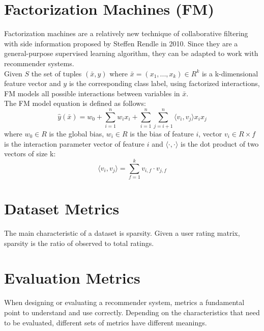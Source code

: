 \section{Factorization Machines (FM)}
\label{factorization-machines}

Factorization machines \cite{10.1109/ICDM.2010.127} are a relatively new technique of collaborative filtering with side information proposed by Steffen Rendle in 2010. Since they are a general-purpose supervised learning algorithm, they can be adapted to work with recommender systems.\\
Given $S$ the set of tuples $(\bar{x}, y)$ where $\bar{x} = (x_1, ..., x_k) \in R^k$ is a k-dimensional feature vector and $y$ is the corresponding class label, using factorized interactions, FM models all possible interactions between variables in $\bar{x}$.\\
The FM model equation is defined as follows:
\begin{equation*}
\hat{y}(\bar{x}) = w_0 + \sum_{i = 1}^{n} w_i x_i + \sum_{i = 1}^{n} \sum_{j = i + 1}^{n} \langle v_i, v_j \rangle x_i x_j
\end{equation*}
where $w_0 \in R$ is the global bias, $w_i \in R$ is the bias of feature $i$, vector $v_i \in R \times f$ is the interaction parameter vector of feature $i$ and $\langle \cdot, \cdot \rangle$ is the dot product of two vectors of size k:
\begin{equation*}
\langle v_i, v_j \rangle = \sum_{f = 1}^{k} v_{i,f} \cdot v_{j,f}
\end{equation*}



\section{Dataset Metrics}

The main characteristic of a dataset is sparsity. Given a user rating matrix, sparsity is the ratio of observed to total ratings. %



\section{Evaluation Metrics}

When designing or evaluating a recommender system, metrics a fundamental point to understand and use correctly. Depending on the characteristics that need to be evaluated, different sets of metrics have different meanings.


